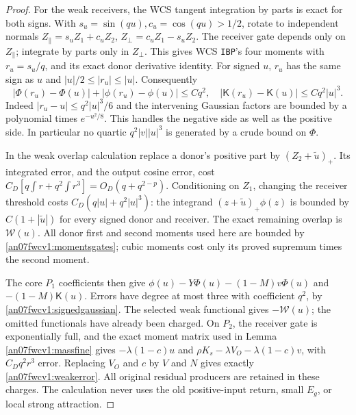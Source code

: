 \documentclass[11pt]{article}
\numberwithin{equation}{section}
\newcommand{\Kfun}{\mathsf K}\newcommand{\Ffun}{\mathsf F}
\begin{document}
\begin{proof}
For the weak receivers, the WCS tangent integration by parts is
exact for both signs. With \(s_u=\sin(qu),c_u=\cos(qu)>1/2\),
rotate to independent normals
\(Z_\parallel=s_uZ_1+c_uZ_2\),
\(Z_\perp=c_uZ_1-s_uZ_2\). The receiver gate depends only
on \(Z_\parallel\); integrate by parts only in \(Z_\perp\).
This gives WCS \texttt{IBP}'s four moments with
\(r_u=s_u/q\), and its exact donor derivative identity.
For signed \(u\), \(r_u\) has the same sign as \(u\) and
\(|u|/2\le|r_u|\le|u|\). Consequently
\begin{equation}
 |\Phi(r_u)-\Phi(u)|+|\phi(r_u)-\phi(u)|\le Cq^2,
 \quad |\Kfun(r_u)-\Kfun(u)|\le Cq^2|u|^3.
 \label{an07fwcv1:signedgaussian}
\end{equation}
Indeed \(|r_u-u|\le q^2|u|^3/6\) and the intervening
Gaussian factors are bounded by a polynomial times
\(e^{-u^2/8}\). This handles the negative side as well as
the positive side. In particular no quartic
\(q^2|v||u|^3\) is generated by a crude bound on \(\Phi\).

In the weak overlap calculation replace a donor's positive part
by \((Z_2+\widetilde u)_+\). Its integrated error, and the
output cosine error, cost
\(C_D[q\int r+q^2\int r^3]=O_D(q+q^{2-p})\).
Conditioning on \(Z_1\), changing the receiver threshold costs
\(C_D(q|u|+q^2|u|^3)\): the integrand
\((z+\widetilde u)_+\phi(z)\) is bounded by
\(C(1+|\widetilde u|)\) for every signed donor and receiver.
The exact remaining overlap is \(\mathcal W(u)\).
All donor first and second moments used here are bounded by
\eqref{an07fwcv1:momentsgates}; cubic moments cost only its
proved supremum times the second moment.

The core \(P_1\) coefficients then give
\(\phi(u)-Y\Phi(u)-(1-M)v\Phi(u)\) and
\(-(1-M)\Kfun(u)\). Errors have degree at most three with
coefficient \(q^2\), by \eqref{an07fwcv1:signedgaussian}.
The selected weak functional gives \(-\mathcal W(u)\);
the omitted functionals have already been charged.
On \(P_2\), the receiver gate is exponentially full, and
the exact moment matrix used in Lemma \ref{an07fwcv1:massfine}
gives \(-\lambda(1-c)u\) and
\(\rho K_s-\lambda V_O-\lambda(1-c)v\),
with \(C_Dq^2r^3\) error. Replacing \(V_O\) and \(c\)
by \(V\) and \(N\) gives exactly
\eqref{an07fwcv1:weakerror}. All original residual producers
are retained in these charges. The calculation never uses
the old positive-input return, small \(E_g\), or local strong
attraction.
\end{proof}
\end{document}
